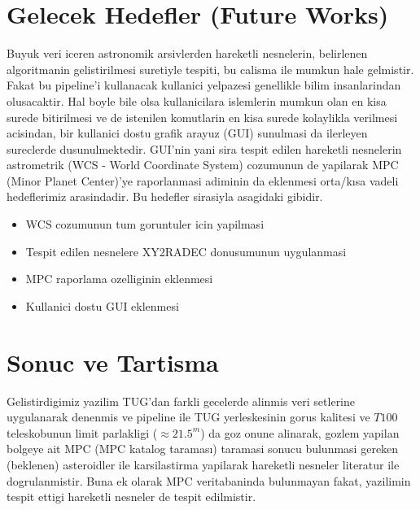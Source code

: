 \documentclass[review]{elsarticle}
\begin{document}
\section{Gelecek Hedefler (Future Works)}

Buyuk veri iceren astronomik arsivlerden hareketli nesnelerin, belirlenen algoritmanin gelistirilmesi suretiyle tespiti, bu calisma ile mumkun hale gelmistir. Fakat bu pipeline'i kullanacak kullanici yelpazesi genellikle bilim insanlarindan olusacaktir. Hal boyle bile olsa kullanicilara islemlerin mumkun olan en kisa surede bitirilmesi ve de istenilen komutlarin en kisa surede kolaylikla verilmesi acisindan, bir kullanici dostu grafik arayuz (GUI) sunulmasi da ilerleyen sureclerde dusunulmektedir. GUI'nin yani sira tespit edilen hareketli nesnelerin astrometrik (WCS - World Coordinate System) cozumunun de yapilarak MPC (Minor Planet Center)'ye raporlanmasi adiminin da eklenmesi orta/kısa vadeli hedeflerimiz arasindadir. Bu hedefler sirasiyla asagidaki gibidir.

\begin{itemize}
\item WCS cozumunun tum goruntuler icin yapilmasi
\item Tespit edilen nesnelere XY2RADEC donusumunun uygulanmasi
\item MPC raporlama ozelliginin eklenmesi
\item Kullanici dostu GUI eklenmesi
\end{itemize}

\section{Sonuc ve Tartisma} \label{conclusion}

Gelistirdigimiz yazilim TUG'dan farkli gecelerde alinmis veri setlerine uygulanarak denenmis ve pipeline ile TUG yerleskesinin gorus kalitesi ve $T100$ teleskobunun limit parlakligi ($\approx 21.5^{m}$) da goz onune alinarak, gozlem yapilan bolgeye ait MPC (MPC katalog taraması) taramasi sonucu bulunmasi gereken (beklenen) asteroidler ile karsilastirma yapilarak hareketli nesneler literatur ile dogrulanmistir. Buna ek olarak MPC veritabaninda bulunmayan fakat, yazilimin tespit ettigi hareketli nesneler de tespit edilmistir.
\end{document}

